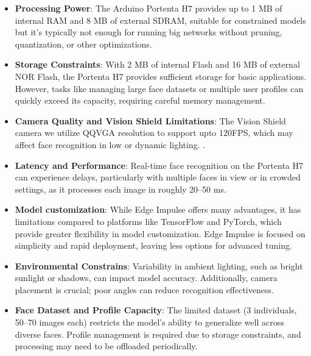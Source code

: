 \begin{itemize}
	\item \textbf{Processing Power}: The Arduino Portenta H7 provides up to 1 MB of internal RAM and 8 MB of external SDRAM, suitable for constrained models but it's typically not enough for running big networks without pruning, quantization, or other optimizations. \cite{ieee:2021Comparison} \cite{wang:2023}
	
	\item \textbf{Storage Constraints}: With 2 MB of internal Flash and 16 MB of external NOR Flash, the Portenta H7 provides sufficient storage for basic applications. However, tasks like managing large face datasets or multiple user profiles can quickly exceed its capacity, requiring careful memory management.
	
	\item \textbf{Camera Quality and Vision Shield Limitations}: The Vision Shield camera we utilize QQVGA resolution to support upto 120FPS, which may affect face recognition in low or dynamic lighting. \cite{arduinoVisionShield:2024}.
	
	\begin{comment}
		\item \textbf{Power Consumption}: In continuous recognition tasks, the Portenta H7 consumes approximately 140–150 mA per image frame. This power demand can reduce performance in prolonged, resource-intensive use cases, especially for battery-operated systems.
		
	\end{comment}
	\item \textbf{Latency and Performance}: Real-time face recognition on the Portenta H7 can experience delays, particularly with multiple faces in view or in crowded settings, as it processes each image in roughly 20–50 ms. \cite{wang:2023} \cite{ieee:2021ImageProcessing}
	
	\item \textbf{Model customization}: While Edge Impulse offers many advantages, it has limitations compared to platforms like TensorFlow and PyTorch, which provide greater flexibility in model customization. Edge Impulse is focused on simplicity and rapid deployment, leaving less options for advanced tuning. \cite{arxiv:2022}
	
	\item \textbf{Environmental Constrains}: Variability in ambient lighting, such as bright sunlight or shadows, can impact model accuracy. Additionally, camera placement is crucial; poor angles can reduce recognition effectiveness.
	
	\item \textbf{Face Dataset and Profile Capacity}: The limited dataset (3 individuals, 50–70 images each) restricts the model’s ability to generalize well across diverse faces. Profile management is required due to storage constraints, and processing may need to be offloaded periodically.
\end{itemize}

